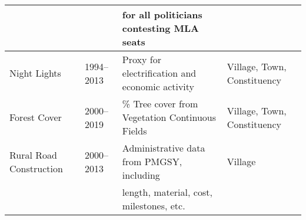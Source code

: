 \begin{tabular}{l l l l}
                          &                        & for all politicians contesting MLA seats                    &                                       \\
  \hline                                                                                                                   
  Night Lights            & 1994--2013             & Proxy for electrification and economic activity             & Village, Town, Constituency           \\
  \hline                                                                                                                   
  Forest Cover            & 2000--2019             & \% Tree cover from Vegetation Continuous Fields             & Village, Town, Constituency           \\
  \hline                                                                                                                   
  Rural Road Construction & 2000--2013             & Administrative data from PMGSY, including                   & Village                               \\
                          &                        & length, material, cost, milestones, etc.                    &                                       \\
  \hline \hline
\end{tabular}
